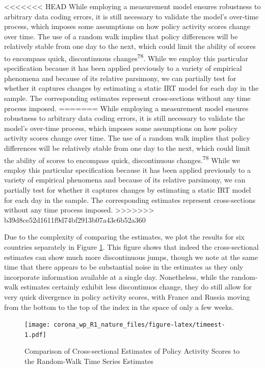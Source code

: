 \documentclass[]{article}
\begin{document}
<<<<<<< HEAD
While employing a measurement model ensures robustness to arbitrary data coding errors, it is still necessary to validate the model's over-time process, which imposes some assumptions on how policy activity scores change over time. The use of a random walk implies that policy differences will be relatively stable from one day to the next, which could limit the ability of scores to encompass quick, discontinuous changes\textsuperscript{78}. While we employ this particular specification because it has been applied previously to a variety of empirical phenomena and because of its relative parsimony, we can partially test for whether it captures changes by estimating a static IRT model for each day in the sample. The corresponding estimates represent cross-sections without any time process imposed.
=======
While employing a measurement model ensures robustness to arbitrary data coding errors, it is still necessary to validate the model's over-time process, which imposes some assumptions on how policy activity scores change over time. The use of a random walk implies that policy differences will be relatively stable from one day to the next, which could limit the ability of scores to encompass quick, discontinuous changes.\textsuperscript{78} While we employ this particular specification because it has been applied previously to a variety of empirical phenomena and because of its relative parsimony, we can partially test for whether it captures changes by estimating a static IRT model for each day in the sample. The corresponding estimates represent cross-sections without any time process imposed.
>>>>>>> b39d8ce52d1611f9d74bf2913b07a43c6b52a360

Due to the complexity of comparing the estimates, we plot the results for six countries separately in Figure \ref{fig:timeest}. This figure shows that indeed the cross-sectional estimates can show much more discontinuous jumps, though we note at the same time that there appears to be substantial noise in the estimates as they only incorporate information available at a single day. Nonetheless, while the random-walk estimates certainly exhibit less discontinuos change, they do still allow for very quick divergence in policy activity scores, with France and Russia moving from the bottom to the top of the index in the space of only a few weeks.

\begin{figure}
\centering
\texttt{[image: corona\_wp\_R1\_nature\_files/figure-latex/timeest-1.pdf]}
\caption{\label{fig:timeest}Comparison of Cross-sectional Estimates of Policy Activity Scores to the Random-Walk Time Series Estimates}
\end{figure}
\end{document}

